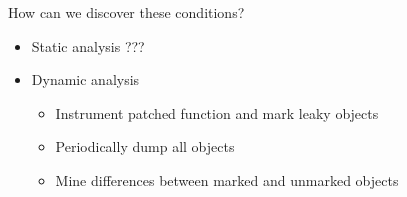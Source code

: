 \begin{frame}{How can we discover these conditions?}%
\begin{itemize}
\item Static analysis ???
\item Dynamic analysis
  \begin{itemize}
  \item Instrument patched function and mark leaky objects
  \item Periodically dump all objects
  \item Mine differences between marked and unmarked objects
  \end{itemize}
\end{itemize}
\end{frame}
